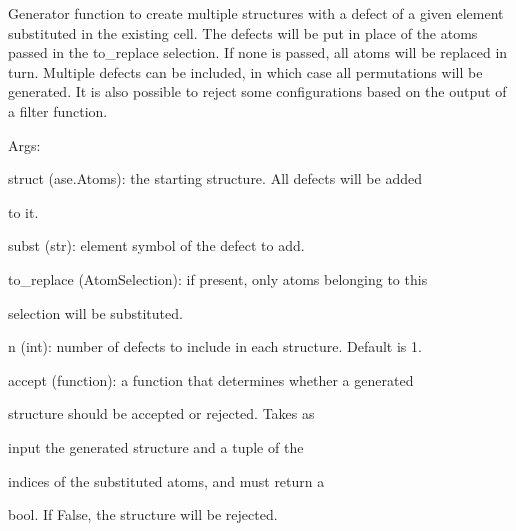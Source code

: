 \documentclass[letterpaper,10pt,english]{sphinxmanual}
\begin{document}
\begin{fulllineitems}
\label{doctree/soprano.collection.generate.defect:soprano.collection.generate.defect.substitutionGen}
Generator function to create multiple structures with a defect of a
given element substituted in the existing cell. The defects will be put in
place of the atoms passed in the to\_replace selection. If none is passed,
all atoms will be replaced in turn. Multiple defects can be included, in
which case all permutations will be generated.
It is also possible to reject some configurations based on the output of a
filter function.

\begin{DUlineblock}{0em}
\item[] Args:
\item[]
\begin{DUlineblock}{\DUlineblockindent}
\item[] struct (ase.Atoms): the starting structure. All defects will be added
\item[]
\begin{DUlineblock}{\DUlineblockindent}
\item[] to it.
\end{DUlineblock}
\item[] subst (str): element symbol of the defect to add.
\item[] to\_replace (AtomSelection): if present, only atoms belonging to this
\item[]
\begin{DUlineblock}{\DUlineblockindent}
\item[] selection will be substituted.
\end{DUlineblock}
\item[] n (int): number of defects to include in each structure. Default is 1.
\item[] accept (function): a function that determines whether a generated
\item[]
\begin{DUlineblock}{\DUlineblockindent}
\item[] structure should be accepted or rejected. Takes as
\item[] input the generated structure and a tuple of the
\item[] indices of the substituted atoms, and must return a
\item[] bool. If False, the structure will be rejected.

\end{DUlineblock}
\end{DUlineblock}
\end{DUlineblock}
\end{fulllineitems}
\end{document}
